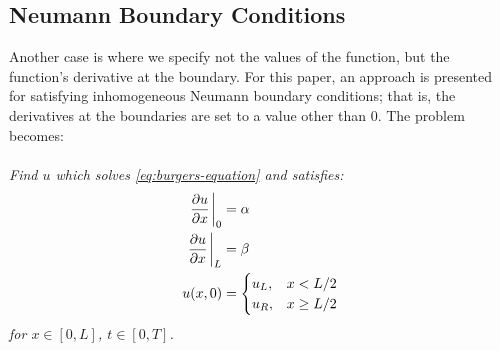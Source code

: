 \subsection{Neumann Boundary Conditions}\label{subsec:neumann}
Another case is where we specify not the values of the function, but the function's derivative at the boundary.
For this paper, an approach is presented for satisfying inhomogeneous Neumann boundary conditions; that is, the derivatives at the boundaries are set to a value other than 0.
The problem becomes:\\~\\

\noindent
\textit{Find $u$ which solves \cref{eq:burgers-equation} and satisfies:
    \begin{equation}
        \label{eq:neumann-bc-and-ic}
        \begin{split}
            \pdv{u}{x}\eval_0&=\alpha\\
            \pdv{u}{x}\eval_L&=\beta \\
            u(x,0)&=\begin{cases}
                        u_L, & x<L/2\\
                        u_R, & x\geq L/2
            \end{cases}
        \end{split}
    \end{equation}
    for $x\in [0,L]$, $t\in[0,T]$.}

